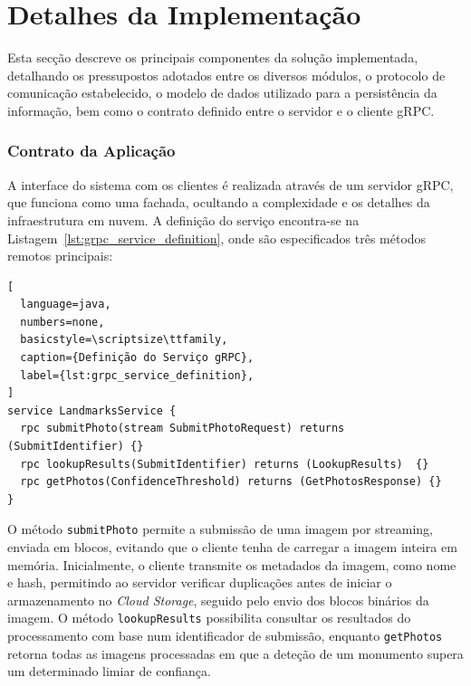 % 

\chapter{Detalhes da Implementação}
\label{cha:implementation_details}
Esta secção descreve os principais componentes da solução implementada, detalhando os pressupostos adotados entre os diversos módulos, o protocolo de comunicação estabelecido, o modelo de dados utilizado para a persistência da informação, bem como o contrato definido entre o servidor e o cliente gRPC.

\subsection{Contrato da Aplicação}
\label{ssec:application_contract}

A interface do sistema com os clientes é realizada através de um servidor gRPC,
que funciona como uma fachada, ocultando a complexidade e os detalhes da
infraestrutura em nuvem. A definição do serviço encontra-se na
Listagem~\ref{lst:grpc_service_definition}, onde são especificados três métodos
remotos principais:

\begin{center}
  \begin{lstlisting}[
  language=java,
  numbers=none,
  basicstyle=\scriptsize\ttfamily,
  caption={Definição do Serviço gRPC},
  label={lst:grpc_service_definition},
]
service LandmarksService {
  rpc submitPhoto(stream SubmitPhotoRequest) returns (SubmitIdentifier) {}
  rpc lookupResults(SubmitIdentifier) returns (LookupResults)  {}
  rpc getPhotos(ConfidenceThreshold) returns (GetPhotosResponse) {}
}
\end{lstlisting}
\end{center}

O método \texttt{submitPhoto} permite a submissão de uma imagem por streaming,
enviada em blocos, evitando que o cliente tenha de carregar a imagem inteira em
memória. Inicialmente, o cliente transmite os metadados da imagem, como nome e
hash, permitindo ao servidor verificar duplicações antes de iniciar o
armazenamento no \textit{Cloud Storage}, seguido pelo envio dos blocos binários
da imagem. O método \texttt{lookupResults} possibilita consultar os resultados
do processamento com base num identificador de submissão, enquanto
\texttt{getPhotos} retorna todas as imagens processadas em que a deteção de um
monumento supera um determinado limiar de confiança.

